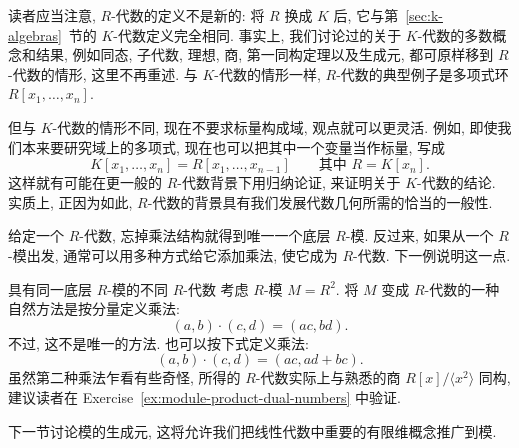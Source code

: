 读者应当注意, $R$-代数的定义不是新的: 将 $R$ 换成 $K$ 后, 它与第~\ref{sec:k-algebras}~节的 $K$-代数定义完全相同. 事实上, 我们讨论过的关于 $K$-代数的多数概念和结果, 例如同态, 子代数, 理想, 商, 第一同构定理以及生成元, 都可原样移到 $R$-代数的情形, 这里不再重述. 与 $K$-代数的情形一样, $R$-代数的典型例子是多项式环 $R[x_{1},\ldots,x_{n}]$.

但与 $K$-代数的情形不同, 现在不要求标量构成域, 观点就可以更灵活. 例如, 即使我们本来要研究域上的多项式, 现在也可以把其中一个变量当作\textquotedbl{}标量\textquotedbl{}, 写成
\[
  K[x_{1},\ldots,x_{n}]=R[x_{1},\ldots,x_{n-1}]
  \qquad\text{其中 }R=K[x_{n}].
\]
这样就有可能在更一般的 $R$-代数背景下用归纳论证, 来证明关于 $K$-代数的结论. 实质上, 正因为如此, $R$-代数的背景具有我们发展代数几何所需的恰当的一般性.

给定一个 $R$-代数, 忘掉乘法结构就得到唯一一个底层 $R$-模. 反过来, 如果从一个 $R$-模出发, 通常可以用多种方式给它添加乘法, 使它成为 $R$-代数. 下一例说明这一点.

\begin{Example}{具有同一底层 $R$-模的不同 $R$-代数}\leavevmode\label{ex:different-algebras-on-same-module}
  考虑 $R$-模 $M=R^{2}$. 将 $M$ 变成 $R$-代数的一种自然方法是按分量定义乘法:
  \[
    (a,b)\cdot(c,d)=(ac,bd).
  \]
  不过, 这不是唯一的方法. 也可以按下式定义乘法:
  \[
    (a,b)\cdot(c,d)=(ac,ad+bc).
  \]
  虽然第二种乘法乍看有些奇怪, 所得的 $R$-代数实际上与熟悉的商 $R[x]/\langle x^{2}\rangle$ 同构, 建议读者在 Exercise~\ref{ex:module-product-dual-numbers} 中验证.
\end{Example}

下一节讨论模的生成元, 这将允许我们把线性代数中重要的有限维概念推广到模.

